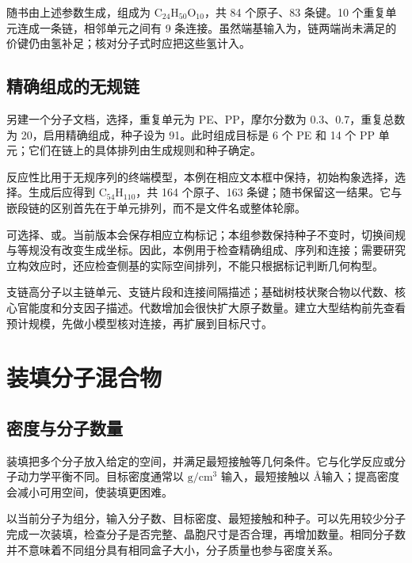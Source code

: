 随书由上述参数生成，组成为 $\mathrm{C_{24}H_{50}O_{10}}$，共 84 个原子、83 条键。10 个重复单元连成一条链，相邻单元之间有 9 条连接。虽然端基输入为，链两端尚未满足的价键仍由氢补足；核对分子式时应把这些氢计入。



\subsection{精确组成的无规链}

另建一个分子文档，选择，重复单元为 PE、PP，摩尔分数为 0.3、0.7，重复总数为 20，启用精确组成，种子设为 91。此时组成目标是 6 个 PE 和 14 个 PP 单元；它们在链上的具体排列由生成规则和种子确定。

反应性比用于无规序列的终端模型，本例在相应文本框中保持，初始构象选择，选择。生成后应得到 $\mathrm{C_{54}H_{110}}$，共 164 个原子、163 条键；随书保留这一结果。它与嵌段链的区别首先在于单元排列，而不是文件名或整体轮廓。

可选择、或。当前版本会保存相应立构标记；本组参数保持种子不变时，切换间规与等规没有改变生成坐标。因此，本例用于检查精确组成、序列和连接；需要研究立构效应时，还应检查侧基的实际空间排列，不能只根据标记判断几何构型。


支链高分子以主链单元、支链片段和连接间隔描述；基础树枝状聚合物以代数、核心官能度和分支因子描述。代数增加会很快扩大原子数量。建立大型结构前先查看预计规模，先做小模型核对连接，再扩展到目标尺寸。

\section{装填分子混合物}

\subsection{密度与分子数量}

装填把多个分子放入给定的空间，并满足最短接触等几何条件。它与化学反应或分子动力学平衡不同。目标密度通常以 $\mathrm{g/cm^3}$ 输入，最短接触以 \AA 输入；提高密度会减小可用空间，使装填更困难。

以当前分子为组分，输入分子数、目标密度、最短接触和种子。可以先用较少分子完成一次装填，检查分子是否完整、晶胞尺寸是否合理，再增加数量。相同分子数并不意味着不同组分具有相同盒子大小，分子质量也参与密度关系。

